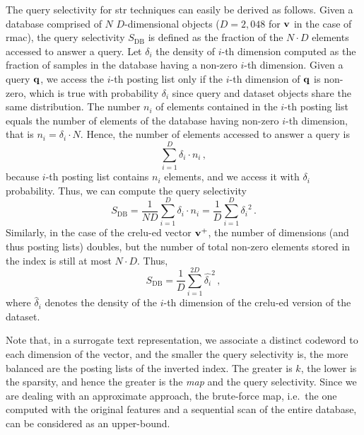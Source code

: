 The query selectivity for \gls{str} techniques can easily be derived as follows.
Given a database comprised of $N$ $D$-dimensional objects ($D=2,048$ for $\mathbf{v}$ in the case of \gls{rmac}), the query selectivity $S_\text{DB}$ is defined as the fraction of the $N \cdot D$ elements accessed to answer a query.
Let $\delta_i$ the density of $i$-th dimension computed as the fraction of samples in the database having a non-zero $i$-th dimension.
Given a query $\mathbf{q}$, we access the $i$-th posting list only if the $i$-th dimension of $ \mathbf{q}$ is non-zero, which is true with probability $\delta_i$ since query and dataset objects share the same distribution.
The number $n_i$ of elements contained in the $i$-th posting list equals the number of elements of the database having non-zero $i$-th dimension, that is $n_i = \delta_i \cdot N$.
Hence, the number of elements accessed to answer a query is
\begin{equation}
\sum_{i=1}^D \delta_i \cdot n_i \,,
\end{equation}
because $i$-th posting list contains $n_i$ elements, and we access it with $\delta_i$ probability.
Thus, we can compute the query selectivity
\begin{equation}
S_\text{DB} = \frac{1}{ND} \sum_{i=1}^D \delta_i \cdot n_i = \frac{1}{D} \sum_{i=1}^D {\delta_i}^2\,.
\end{equation}
Similarly, in the case of the \gls{crelu}-ed vector $\mathbf{v}^+$, the number of dimensions (and thus posting lists) doubles, but the number of total non-zero elements stored in the index is still at most $N \cdot D$.
Thus,
\begin{equation}
S_\text{DB} = \frac{1}{D} \sum_{i=1}^{2D} \hat{\delta_i}^2 \,,
\end{equation}
where $\hat{\delta}_i$ denotes the density of the $i$-th dimension of the \gls{crelu}-ed version of the dataset.

Note that, in a surrogate text representation, we associate a distinct codeword to each dimension of the vector, and the smaller the query selectivity is, the more balanced are the posting lists of the inverted index.
The greater is $k$, the lower is the sparsity, and hence the greater is the \emph{\gls{map}} and the query selectivity.
Since we are dealing with an approximate approach, the brute-force \gls{map}, i.e.\ the one computed with the original features and a sequential scan of the entire database, can be considered as an upper-bound.

